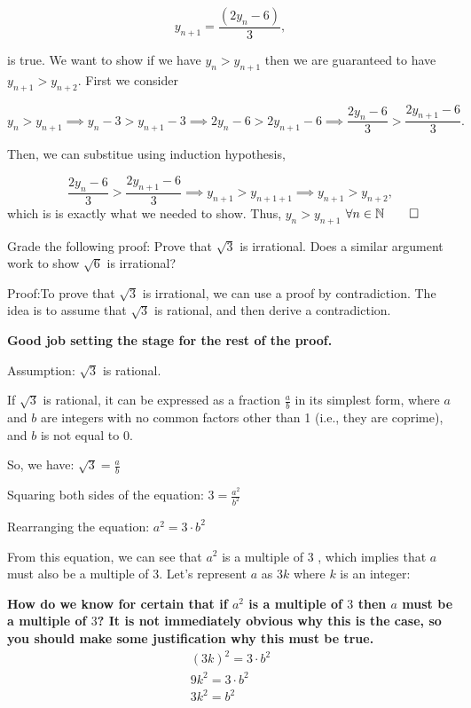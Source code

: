 \documentclass{report}
\begin{document}
$$ y_{n+1}  = \frac{(2y_n -6 )}{3}, $$ 

is true. We want to show if we have $ y_n > y_{n+1}$ then we are guaranteed to have $y_{n+1} > y_{n+2}$. First we consider

$$y_n > y_{n+1} \implies  y_n -3  >  y_{n+1}-3 \implies  2y_n -6  >  2y_{n+1}-6 \implies \frac{2y_n -6 }{3} >  \frac{2y_{n+1}-6}{3}.$$


Then, we can substitue using induction hypothesis,


$$ \frac{2y_n -6 }{3} >  \frac{2y_{n+1}-6}{3} \implies y_{n+1} > y_{n+1+1} \implies y_{n+1} > y_{n+2},$$ 
which is is exactly what we needed to show. Thus, $ y_{n} > y_{n+1}$ $\forall n \in \mathbb{N} \qed$

\bigskip

\qs{}
{Grade the following proof: Prove that $\sqrt{3}$ is irrational. Does a similar argument work to show $\sqrt{6}$ is irrational?}

Proof:To prove that $\sqrt{3}$ is irrational, we can use a proof by contradiction. The idea is to assume that $\sqrt{3}$ is rational, and then derive a contradiction.

\textbf{Good job setting the stage for the rest of the proof.}

Assumption: $\sqrt{3}$ is rational.

If $\sqrt{3}$ is rational, it can be expressed as a fraction $\frac{a}{b}$ in its simplest form, where $a$ and $b$ are integers with no common factors other than 1 (i.e., they are coprime), and $b$ is not equal to 0.

So, we have: $\sqrt{3}=\frac{a}{b}$

Squaring both sides of the equation: $3=\frac{a^{2}}{b^{2}}$

Rearranging the equation: $a^{2}=3 \cdot b^{2}$

From this equation, we can see that $a^{2}$ is a multiple of 3 , which implies that $a$ must also be a multiple of 3. Let's represent $a$ as $3 k$ where $k$ is an integer:

\textbf{
How do we know for certain  that if $a^2$ is a multiple of  $3$ then $a$ must be a multiple of $3$? It is not immediately obvious why this is the case, so you should make some justification why this must be true.
}
$$
\begin{gathered}
(3 k)^{2}=3 \cdot b^{2} \\
9 k^{2}=3 \cdot b^{2} \\
3 k^{2}=b^{2}
\end{gathered}
$$
\end{document}
